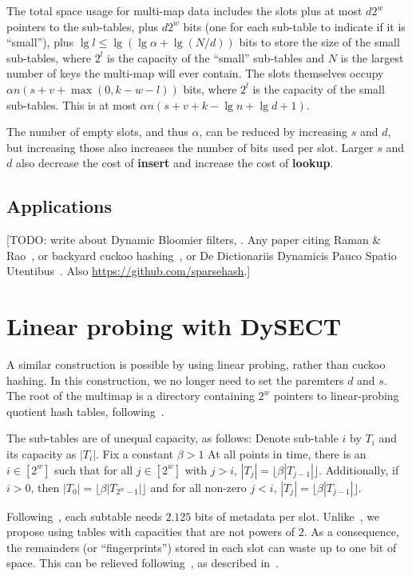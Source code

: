 \documentclass[11pt,letterpaper]{article}
\begin{document}
The total space usage for multi-map data includes the slots plus at most $d 2^w$ pointers to the sub-tables, plus $d 2^w$ bits (one for each sub-table to indicate if it is ``small''), plus $\lg l \leq \lg (\lg \alpha + \lg (N/d))$ bits to store the size of the small sub-tables, where $2^l$ is the capacity of the ``small'' sub-tables and $N$ is the largest number of keys the multi-map will ever contain.
The slots themselves occupy $\alpha n (s + v + \max(0, k - w - l))$ bits, where $2^l$ is the capacity of the small sub-tables.
This is at most $\alpha n (s + v + k - \lg n + \lg d + 1)$.

The number of empty slots, and thus $\alpha$, can be reduced by increasing $s$ and $d$, but increasing those also increases the number of bits used per slot.
Larger $s$ and $d$ also decrease the cost of {\bf insert} and increase the cost of {\bf lookup}.


\subsection{Applications}

[TODO: write about Dynamic Bloomier filters, \cite{DBLP:journals/corr/abs-cs-0502032}. Any paper citing Raman \& Rao~\cite{raman2003succinct}, or backyard cuckoo hashing~\cite{DBLP:journals/corr/abs-0912-5424}, or De Dictionariis Dynamicis Pauco Spatio Utentibus~\cite{DBLP:journals/corr/abs-cs-0512081}. Also \url{https://github.com/sparsehash}.]

\section{Linear probing with DySECT}

A similar construction is possible by using linear probing, rather than cuckoo hashing.
In this construction, we no longer need to set the paremters $d$ and $s$.
The root of the multimap is a directory containing $2^w$ pointers to linear-probing quotient hash tables, following~\cite{pandey2017general}.

The sub-tables are of unequal capacity, as follows:
Denote sub-table $i$ by $T_i$ and its capacity as $|T_i|$.
Fix a constant $\beta > 1$
At all points in time, there is an $i \in [2^w]$ such that for all $j \in [2^w]$ with $j > i$, $|T_j| = \lfloor \beta | T_{j-1} | \rfloor$.
Additionally, if $i > 0$, then $|T_0| = \lfloor \beta |T_{2^w-1}| \rfloor$ and for all non-zero $j < i$, $|T_j| = \lfloor \beta | T_{j-1} | \rfloor$.

Following~\cite{pandey2017general}, each subtable needs $2.125$ bits of metadata per slot.
Unlike~\cite{pandey2017general}, we propose using tables with capacities that are not powers of $2$.
As a consequence, the remainders (or ``fingerprints'') stored in each slot can waste up to one bit of space.
This can be relieved following~\cite{trits}, as described in~\cite{10.1007/978-3-030-25027-0_3}.
\end{document}

